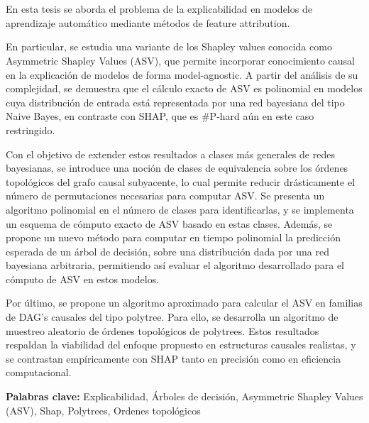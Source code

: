 \section*{\runtitulo}


\noindent En esta tesis se aborda el problema de la explicabilidad en modelos de aprendizaje automático mediante métodos de feature attribution.

En particular, se estudia una variante de los Shapley values conocida como Asymmetric Shapley Values (ASV), que permite incorporar conocimiento causal en la explicación de modelos de forma model-agnostic. A partir del análisis de su complejidad, se demuestra que el cálculo exacto de ASV es polinomial en modelos cuya distribución de entrada está representada por una red bayesiana del tipo Naive Bayes, en contraste con SHAP, que es \#P-hard aún en este caso restringido.

Con el objetivo de extender estos resultados a clases más generales de redes bayesianas, se introduce una noción de clases de equivalencia sobre los órdenes topológicos del grafo causal subyacente, lo cual permite reducir drásticamente el número de permutaciones necesarias para computar ASV. Se presenta un algoritmo polinomial en el número de clases para identificarlas, y se implementa un esquema de cómputo exacto de ASV basado en estas clases. Además, se propone un nuevo método para computar en tiempo polinomial la predicción esperada de un árbol de decisión, sobre una distribución dada por una red bayesiana arbitraria, permitiendo así evaluar el algoritmo desarrollado para el cómputo de ASV en estos modelos. 

Por último, se propone un algoritmo aproximado para calcular el ASV en familias de DAG's causales del tipo polytree. Para ello, se desarrolla un algoritmo de muestreo aleatorio de órdenes topológicos de polytrees. Estos resultados respaldan la viabilidad del enfoque propuesto en estructuras causales realistas, y se contrastan empíricamente con SHAP tanto en precisión como en eficiencia computacional.
    \bigskip
    
    \noindent\textbf{Palabras clave:} Explicabilidad, Árboles de decisión, Asymmetric Shapley Values (ASV), Shap, Polytrees, Ordenes topológicos

\cleardoublepage

\section*{\runtitle}

